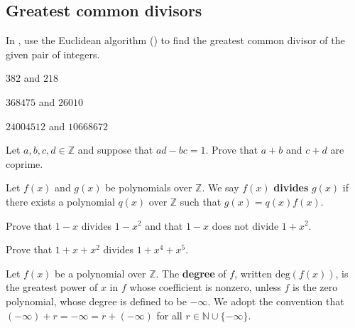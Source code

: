 \subsection*{Greatest common divisors}

In , use the Euclidean algorithm () to find the greatest common divisor of the given pair of integers.

\begin{chapex}
\label{cqEuclideanAlgorithmBegin}
$382$ and $218$
\end{chapex}

\begin{chapex}
$368475$ and $26010$
\end{chapex}

\begin{chapex}
\label{cqEuclideanAlgorithmEnd}
$24004512$ and $10668672$
\end{chapex}

\begin{chapex}
Let $a,b,c,d \in \mathbb{Z}$ and suppose that $ad-bc = 1$. Prove that $a+b$ and $c+d$ are coprime.
\end{chapex}

\begin{definition}
Let $f(x)$ and $g(x)$ be polynomials over $\mathbb{Z}$. We say $f(x)$ \textbf{divides} $g(x)$ if there exists a polynomial $q(x)$ over $\mathbb{Z}$ such that $g(x) = q(x)f(x)$.
\end{definition}

\begin{chapex}
Prove that $1-x$ divides $1-x^2$ and that $1-x$ does not divide $1+x^2$.
\end{chapex}

\begin{chapex}
Prove that $1+x+x^2$ divides $1+x^4+x^5$.
\end{chapex}

\begin{definition}
Let $f(x)$ be a polynomial over $\mathbb{Z}$. The \textbf{degree} of $f$, written $\mathrm{deg}(f(x))$, is the greatest power of $x$ in $f$ whose coefficient is nonzero, unless $f$ is the zero polynomial, whose degree is defined to be $-\infty$. We adopt the convention that $(-\infty) + r = -\infty = r + (-\infty)$ for all $r \in \mathbb{N} \cup \{ -\infty \}$.
\end{definition}

